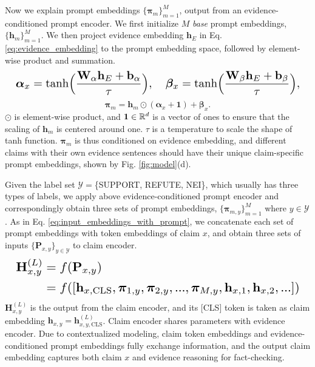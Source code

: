 Now we explain prompt embeddings $ \{\bm{\pi}_m\}_{m=1}^M $, output from an evidence-conditioned prompt encoder. We first initialize $ M $ \emph{base} prompt embeddings, $ \{\textbf{h}_m\}_{m=1}^M $. We then project evidence embedding $ \textbf{h}_E $ in Eq. \ref{eq:evidence_embedding} to the prompt embedding space, followed by element-wise product and summation.
\begin{equation}
\label{eq:scaling_and_shifting}
\resizebox{\columnwidth}{!}{
    $ \bm{\alpha}_x=\text{tanh}\Big(\dfrac{\textbf{W}_\alpha\textbf{h}_E+\textbf{b}_\alpha}{\tau}\Big),\quad\bm{\beta}_x=\text{tanh}\Big(\dfrac{\textbf{W}_\beta\textbf{h}_E+\textbf{b}_\beta}{\tau}\Big), $
}
\end{equation}
\begin{equation}
\label{eq:scaling_and_shifting2}
    \bm{\pi}_m=\textbf{h}_m\odot(\bm{\alpha}_x+\textbf{1})+\bm{\beta}_x.
\end{equation}
$ \odot $ is element-wise product, and $ \textbf{1}\in\Bbb R^d $ is a vector of ones to ensure that the scaling of $ \textbf{h}_m $ is centered around one. $ \tau $ is a temperature to scale the shape of tanh function. $ \bm{\pi}_m $ is thus conditioned on evidence embedding, and different claims with their own evidence sentences should have their unique claim-specific prompt embeddings, shown by Fig. \ref{fig:model}(d).

Given the label set  $ \mathcal{Y}= $\{SUPPORT, REFUTE, NEI\}, which usually has three types of labels, we apply above evidence-conditioned prompt encoder and correspondingly obtain three sets of prompt embeddings, $ \{\bm{\pi}_{m,y}\}_{m=1}^M $ where $ y\in\mathcal{Y} $. As in Eq. \ref{eq:input_embeddings_with_prompt}, we concatenate each set of prompt embeddings with token embeddings of claim $ x $, and obtain three sets of inputs $ \{\textbf{P}_{x,y}\}_{y\in\mathcal{Y}} $ to claim encoder.
\begin{equation}
\resizebox{\columnwidth}{!}{
$ \begin{split}
    \textbf{H}_{x,y}^{(L)}&=f(\textbf{P}_{x,y})\\
    &=f([\textbf{h}_{x,\text{CLS}},\bm{\pi}_{1,y},\bm{\pi}_{2,y},...,\bm{\pi}_{M,y},\textbf{h}_{x,1},\textbf{h}_{x,2},...])
\end{split} $
}
\end{equation}
$ \textbf{H}_{x,y}^{(L)} $ is the output from the claim encoder, and its [CLS] token is taken as claim embedding $ \textbf{h}_{x,y}=\textbf{h}_{x,y,\text{CLS}}^{(L)} $. Claim encoder shares parameters with evidence encoder. Due to contextualized modeling, claim token embeddings and evidence-conditioned prompt embeddings fully exchange information, and the output claim embedding captures both claim $ x $ and evidence reasoning for fact-checking.

